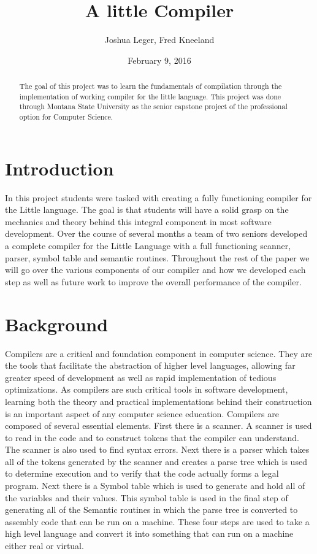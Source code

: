 \documentclass[12pt]{article}
\title{A little Compiler}
\author{Joshua Leger, Fred Kneeland}
\date{February 9, 2016}
\begin{document}
    \maketitle
    \begin{abstract}
    
        The goal of this project was to learn the fundamentals of compilation through the implementation of working compiler for the little language.  This project was done through Montana State University as the senior capstone project of the professional option for Computer Science.   
    
    \end{abstract}
    \clearpage
    \tableofcontents
    \clearpage
    
    \section{Introduction}
        In this project students were tasked with creating a fully functioning compiler for the Little language.  The goal is that students will have a solid grasp on the mechanics and theory behind this integral component in most software development.  Over the course of several months a team of two seniors developed a complete compiler for the Little Language with a full functioning scanner, parser, symbol table and semantic routines.  Throughout the rest of the paper we will go over the various components of our compiler and how we developed each step as well as future work to improve the overall performance of the compiler.
            
    \section{Background}
        Compilers are a critical and foundation component in computer science.  They are the tools that facilitate the abstraction of higher level languages, allowing far greater speed of development as well as rapid implementation of tedious optimizations.  As compilers are such critical tools in software development, learning both the theory and practical implementations behind their construction is an important aspect of any computer science education.  
        Compilers are composed of several essential elements.  First there is a scanner.  A scanner is used to read in the code and to construct tokens that the compiler can understand.  The scanner is also used to find syntax errors.  Next there is a parser which takes all of the tokens generated by the scanner and creates a parse tree which is used to determine execution and to verify that the code actually forms a legal program.  Next there is a Symbol table which is used to generate and hold all of the variables and their values.  This symbol table is used in the final step of generating all of the Semantic routines in which the parse tree is converted to assembly code that can be run on a machine.  These four steps are used to take a high level language and convert it into something that can run on a machine either real or virtual. 
        
\end{document}
